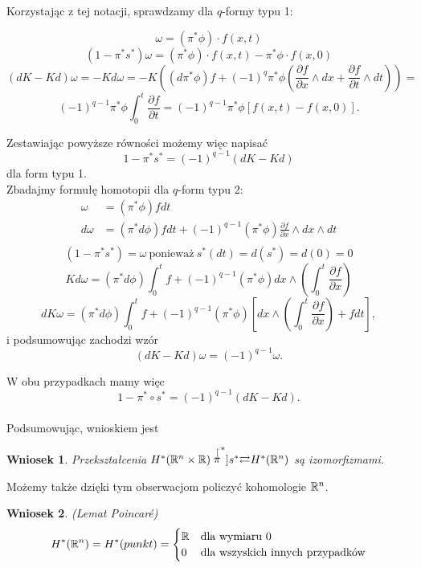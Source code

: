 \documentclass[licencjacka]{pracamgr}
\theoremstyle{definition}
\theoremstyle{definition}
\theoremstyle{plain}
\theoremstyle{plain}
\theoremstyle{plain}
\theoremstyle{plain}
\newtheorem{wniosek}{Wniosek}[section]
\def\R{\ensuremath\mathbb{R}}
\begin{document}
Korzystając z tej notacji, sprawdzamy dla $q$-formy typu 1:

\[
    \omega = (\pi^\ast \phi) \cdot f(x,t)
\]
\[
    (1 - \pi^\ast s^\ast) \omega =
       (\pi^\ast \phi) \cdot f(x,t) - \pi^\ast \phi \cdot f(x,0)
\]
\[
    (dK - Kd) \omega = - K d\omega = 
    -K \left(
    (d \pi^\ast \phi)f +
    (-1)^q \pi^\ast \phi \left(
       \frac{\partial f}{\partial x} \wedge dx +
       \frac{\partial f}{\partial t} \wedge dt
       \right)
    \right) =
\]
\[
    (-1)^{q-1}\pi^\ast \phi \int_0^t \frac{\partial f}{\partial t}
    = (-1)^{q-1} \pi^\ast \phi [f(x,t) - f(x,0)].
\]

Zestawiając powyższe równości możemy więc napisać
\[
    1 - \pi^\ast s^\ast = (-1)^{q-1}(dK - Kd)
\]
dla form typu 1. \\

Zbadajmy formułę homotopii dla $q$-form typu 2:
\begin{align*}
     \omega &= (\pi^\ast \phi)f dt \\
    d\omega &= (\pi^\ast d \phi)f dt + 
      (-1)^{q-1}(\pi^\ast \phi) \frac{\partial f}{\partial x} 
        \wedge dx \wedge dt \\
\end{align*}
\[
    (1 - \pi^\ast s^\ast) = \omega ~\text{ponieważ}~
     s^\ast(dt) = d(s^\ast) = d(0) = 0
\]
\[
    Kd\omega = (\pi^\ast d\phi) \int_0^tf +
      (-1)^{q-1} (\pi^\ast \phi)
          dx \wedge (\int_0^t \frac{\partial f}{\partial x})
\]
\[
    dK\omega = (\pi^\ast d\phi) \int_0^tf +
      (-1)^{q-1} (\pi^\ast \phi)
      \left[
          dx \wedge (\int_0^t \frac{\partial f}{\partial x})
          + f dt
      \right],
\]
i podsumowując zachodzi wzór
\[
    (dK - Kd) \omega = (-1)^{q-1} \omega.
\]

W obu przypadkach mamy więc 
\[
1 - \pi^\ast \circ s^\ast = (-1)^{q-1}(dK - Kd).
\] \\

Podsumowując, wnioskiem jest 
\begin{wniosek}\label{pi-is-isomorphism}
Przekształcenia $H^\ast (\R^n \times \R)
\stackrel[\pi^\ast]{s^\ast}{\rightleftarrows} H^\ast(\R^n)$ są izomorfizmami.
\end{wniosek}
Możemy także dzięki tym obserwacjom policzyć kohomologie $\R^n$.
\begin{wniosek}(Lemat Poincaré)
\[
H^\ast(\R^n) = H^\ast(punkt) = 
\begin{cases}
\R & \text{dla wymiaru 0} \\
0 & \text{dla wszyskich innych przypadków} \\
\end{cases}
\]
\end{wniosek} 
\end{document}
